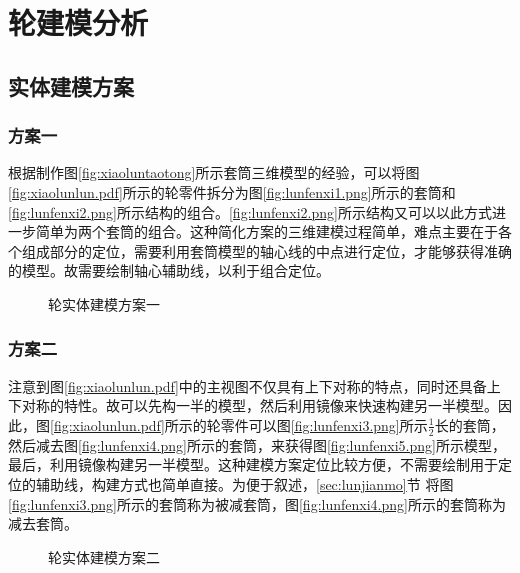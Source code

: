 \section{轮建模分析}
\subsection{实体建模方案}
\subsubsection{方案一}
根据制作图\ref{fig:xiaoluntaotong}所示套筒三维模型的经验，可以将图\ref{fig:xiaolunlun.pdf}所示的轮零件拆分为图\ref{fig:lunfenxi1.png}所示的套筒和\ref{fig:lunfenxi2.png}所示结构的组合。\ref{fig:lunfenxi2.png}所示结构又可以以此方式进一步简单为两个套筒的组合。这种简化方案的三维建模过程简单，难点主要在于各个组成部分的定位，需要利用套筒模型的轴心线的中点进行定位，才能够获得准确的模型。故需要绘制轴心辅助线，以利于组合定位。
\begin{figure}[htbp]
\centering
{}\hspace{20pt}
\caption{轮实体建模方案一}
\end{figure}
\subsubsection{方案二}

注意到图\ref{fig:xiaolunlun.pdf}中的主视图不仅具有上下对称的特点，同时还具备上下对称的特性。故可以先构一半的模型，然后利用镜像来快速构建另一半模型。因此，图\ref{fig:xiaolunlun.pdf}所示的轮零件可以图\ref{fig:lunfenxi3.png}所示$\frac{1}{2}$长的套筒，然后减去图\ref{fig:lunfenxi4.png}所示的套筒，来获得图\ref{fig:lunfenxi5.png}所示模型，最后，利用镜像构建另一半模型。这种建模方案定位比较方便，不需要绘制用于定位的辅助线，构建方式也简单直接。为便于叙述，\ref{sec:lunjianmo}节 将图\ref{fig:lunfenxi3.png}所示的套筒称为被减套筒，图\ref{fig:lunfenxi4.png}所示的套筒称为减去套筒。
\begin{figure}[htbp]
\centering
{}\hspace{20pt}
\hspace{20pt}
\caption{轮实体建模方案二}
\end{figure}


